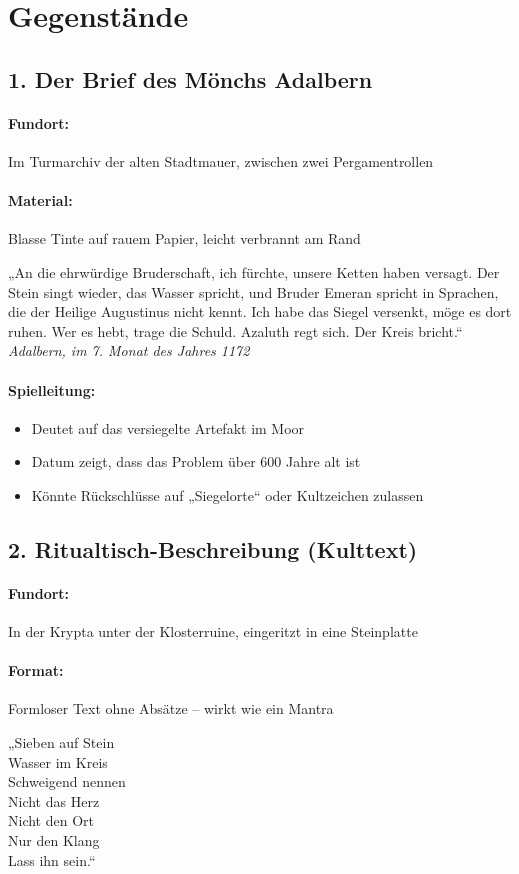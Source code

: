 \section{Gegenstände}
\subsection*{1. Der Brief des Mönchs Adalbern}
\paragraph{Fundort:} Im Turmarchiv der alten Stadtmauer, zwischen zwei Pergamentrollen
\paragraph{Material:} Blasse Tinte auf rauem Papier, leicht verbrannt am Rand\\
\begin{displayquote}
„An die ehrwürdige Bruderschaft,
ich fürchte, unsere Ketten haben versagt. Der Stein singt wieder, das Wasser spricht, und Bruder Emeran spricht in Sprachen, die der Heilige Augustinus nicht kennt.
Ich habe das Siegel versenkt, möge es dort ruhen. Wer es hebt, trage die Schuld.
Azaluth regt sich. Der Kreis bricht.“\\
\textit{Adalbern, im 7. Monat des Jahres 1172}
\end{displayquote}
\paragraph{Spielleitung:}
\begin{itemize}
\item Deutet auf das versiegelte Artefakt im Moor
\item Datum zeigt, dass das Problem über 600 Jahre alt ist
\item Könnte Rückschlüsse auf „Siegelorte“ oder Kultzeichen zulassen
\end{itemize}

\subsection*{2. Ritualtisch-Beschreibung (Kulttext)}
\paragraph{Fundort:} In der Krypta unter der Klosterruine, eingeritzt in eine Steinplatte
\paragraph{Format:} Formloser Text ohne Absätze – wirkt wie ein Mantra
\begin{displayquote}
„Sieben auf Stein\\
Wasser im Kreis\\
Schweigend nennen\\
Nicht das Herz\\
Nicht den Ort\\
Nur den Klang\\
Lass ihn sein.“
\end{displayquote}
